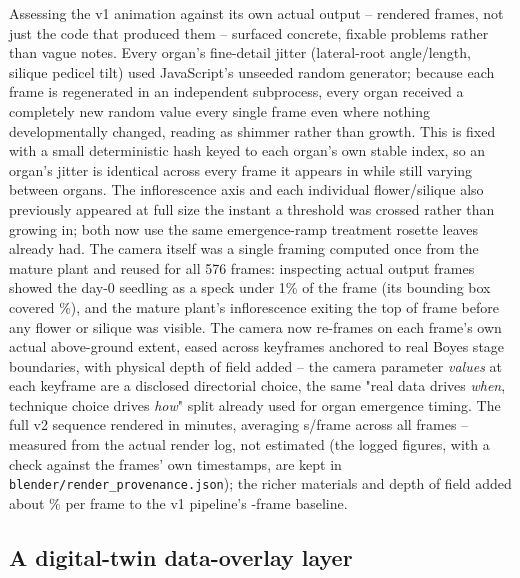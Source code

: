 Assessing the v1 animation against its own actual output -- rendered frames, not just the
code that produced them -- surfaced concrete, fixable problems rather than vague notes.
Every organ's fine-detail jitter (lateral-root angle/length, silique pedicel tilt) used
JavaScript's unseeded random generator; because each frame is regenerated in an independent
subprocess, every organ received a completely new random value every single frame even
where nothing developmentally changed, reading as shimmer rather than growth. This is fixed
with a small deterministic hash keyed to each organ's own stable index, so an organ's jitter
is identical across every frame it appears in while still varying between organs. The
inflorescence axis and each individual flower/silique also previously appeared at full size
the instant a threshold was crossed rather than growing in; both now use the same
emergence-ramp treatment rosette leaves already had. The camera itself was a single framing
computed once from the mature plant and reused for all 576 frames: inspecting actual output
frames showed the day-0 seedling as a speck under 1\% of the frame (its bounding box covered
\DayZeroFrameBoxPercent{}\%), and the mature plant's
inflorescence exiting the top of frame before any flower or silique was visible. The camera
now re-frames on each frame's own actual above-ground extent, eased across keyframes
anchored to real Boyes stage boundaries, with physical depth of field added -- the camera
parameter \emph{values} at each keyframe are a disclosed directorial choice, the same
"real data drives \emph{when}, technique choice drives \emph{how}" split already used for
organ emergence timing. The full v2 sequence rendered in \RenderTotalMinutes{} minutes,
averaging \RenderAvgSecondsPerFrame{}s/frame across all \NumAnimationFrames{} frames --
measured from the actual render log, not estimated (the logged figures, with a check against the
frames' own timestamps, are kept in \texttt{blender/render\_provenance.json}); the richer materials
and depth of field added about \RenderOverheadPercent{}\% per frame to the v1 pipeline's
\NumAnimationFrames{}-frame baseline.

\subsection{A digital-twin data-overlay layer}

